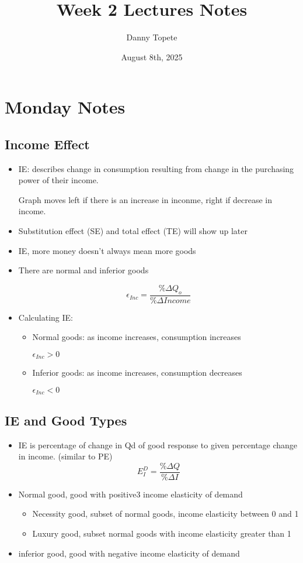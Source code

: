\documentclass{article}
\title{Week 2 Lectures Notes}
\author{Danny Topete}
\date{August 8th, 2025}
\begin{document}
\maketitle

\section{Monday Notes}
\subsection{Income Effect}
\begin{itemize}
  \item IE: describes change in consumption resulting from change in the purchasing power of their income.

    Graph moves left if there is an increase in inconme, right if decrease in income.
  \item Substitution effect (SE) and total effect (TE) will show up later
  \item IE, more money doesn't always mean more goods
  \item There are normal and inferior goods

    $$ \epsilon{}_{Inc} = \frac{\%\Delta Q_o}{\%\Delta Income} $$
  \item Calculating IE:
    \begin{itemize}
      \item Normal goods: as income increases, consumption increases

        $\epsilon{}_{Inc} > 0$
      \item Inferior goods: as income increases, consumption decreases

        $\epsilon{}_{Inc} < 0$
    \end{itemize}
\end{itemize}

\subsection{IE and Good Types}
\begin{itemize}
  \item IE is percentage of change in Qd of good response to given percentage change in income.
    (similar to PE)
    $$ E_{I}^D  = \frac{\%\Delta Q}{\% \Delta I} $$
  \item Normal good, good with positive3 income elasticity of demand
    \begin{itemize}
      \item Necessity good, subset of normal goods, income elasticity between 0 and 1
      \item Luxury good, subset normal goods with income elasticity greater than 1
    \end{itemize}
  \item inferior good, good with negative income elasticity of demand
\end{itemize}
\end{document}
